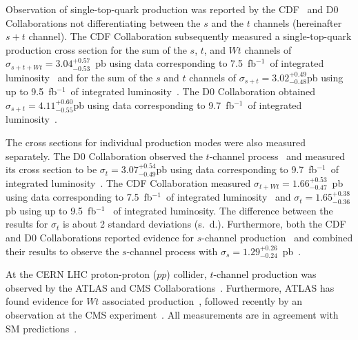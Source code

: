 \documentclass[aps,prl,twocolumn,showpacs,superscriptaddress,groupedaddress]{revtex4}  %
\newcommand{\ifb}       {fb$^{-1}$}
\newcommand{\Wt}{\ensuremath{\mathit{\!Wt}}\xspace}
\newcommand{\xsectev}{1.29}
\newcommand{\xsecteverrorup}{+0.26}
\newcommand{\xsecteverrordown}{-0.24}
\begin{document}
Observation of single-top-quark production was reported by the
CDF~\cite{stop-obs-2009-cdf,Aaltonen:2010fs,cdf-prd-2010} and
D0~\cite{stop-obs-2009-d0,stop-2011-d0} Collaborations not
differentiating between
the $s$ and the $t$ channels (hereinafter $s+t$ channel). The CDF
Collaboration subsequently measured a single-top-quark production
cross section for the sum of the $s$, $t$, and \Wt channels of
$\sigma_{s+t+\Wt} =3.04^{+0.57}_{-0.53}$~pb using data corresponding
to 7.5~\ifb\ of integrated luminosity~\cite{cdf_channels_7.5} and for
the sum of the $s$ and $t$ channels of $\sigma_{s+t} =
3.02^{+0.49}_{-0.48}$\;pb using up to 9.5~\ifb\ of integrated
luminosity~\cite{cdf_channels}. The D0 Collaboration obtained
$\sigma_{s+t} = 4.11^{+0.60}_{-0.55}$\;pb using data corresponding to
9.7~\ifb\ of integrated luminosity~\cite{d0_schannel}. 

The cross sections for individual production modes were also measured separately. 
The D0 Collaboration observed the $t$-channel
process~\cite{t-channel-new} and measured its cross section to be $\sigma_t =
3.07^{+0.54}_{-0.49}$\;pb using data corresponding to 9.7~\ifb\ of
integrated luminosity~\cite{d0_schannel}. 
The CDF Collaboration measured $\sigma_{t+\Wt} =
1.66^{+0.53}_{-0.47}$~pb using data corresponding to 7.5~\ifb\ of
integrated luminosity~\cite{cdf_channels_7.5} and $\sigma_t =
1.65^{+0.38}_{-0.36}$\;pb using up to 9.5~\ifb~\cite{cdf_channels} of
integrated luminosity. The difference between the results for
$\sigma_t$ is about 2 standard deviations (s.\ d.). 
Furthermore, both the CDF and D0 Collaborations reported evidence for
$s$-channel
production~\cite{cdf_schannel,cdf_schannel_MET,d0_schannel} and
combined their results 
to observe the $s$-channel process with $\sigma_s =
\xsectev^{\xsecteverrorup}_{\xsecteverrordown}$~pb~\cite{tev_schannel}. 

At the CERN LHC proton-proton ($pp$) collider, $t$-channel production
was observed by the ATLAS and CMS
Collaborations~\cite{atlas-tchannel-1,atlas-tchannel-2,cms-tchannel-1,cms-tchannel-2}.
Furthermore,  ATLAS has found evidence for $\Wt$ associated
production~\cite{atlas-tW}, followed recently by an observation at the
CMS experiment~\cite{cms-tW}. All measurements are in agreement with
SM predictions~\cite{schannel-kidonakis,tchannel-kidonakis}. 



\end{document}
